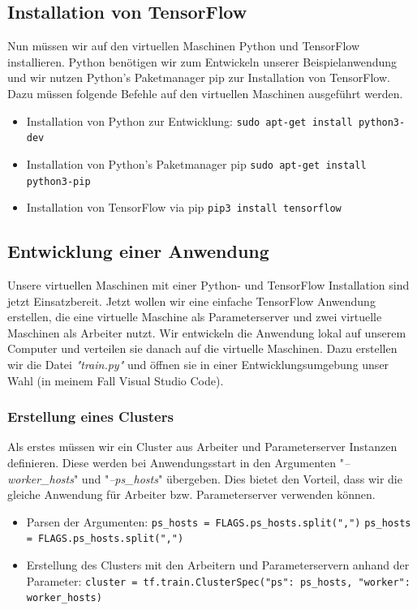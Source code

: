 \subsection{Installation von TensorFlow}
Nun müssen wir auf den virtuellen Maschinen Python und TensorFlow installieren. Python benötigen wir zum Entwickeln unserer Beispielanwendung und wir nutzen Python's Paketmanager pip zur Installation von TensorFlow. Dazu müssen folgende Befehle auf den virtuellen Maschinen ausgeführt werden.
\begin{itemize}
	\item Installation von Python zur Entwicklung:\newline
			\texttt{sudo apt-get install python3-dev}
	\item Installation von Python's Paketmanager pip\newline
			\texttt{sudo apt-get install python3-pip}
	\item Installation von TensorFlow via pip\newline
			\texttt{pip3 install tensorflow}
\end{itemize}

\subsection{Entwicklung einer Anwendung}
Unsere virtuellen Maschinen mit einer Python- und TensorFlow Installation sind jetzt Einsatzbereit. Jetzt wollen wir eine einfache TensorFlow Anwendung erstellen, die eine virtuelle Maschine als Parameterserver und zwei virtuelle Maschinen als Arbeiter nutzt. Wir entwickeln die Anwendung lokal auf unserem Computer und verteilen sie danach auf die virtuelle Maschinen. Dazu erstellen wir die Datei \textit{"train.py"} und öffnen sie in einer Entwicklungsumgebung unser Wahl (in meinem Fall Visual Studio Code). 

\vspace{2mm}
\subsubsection{Erstellung eines Clusters}
Als erstes müssen wir ein Cluster aus Arbeiter und Parameterserver Instanzen definieren. Diese werden bei Anwendungsstart in den Argumenten "\textit{--worker\_hosts}" und "\textit{--ps\_hosts}" übergeben. Dies bietet den Vorteil, dass wir die gleiche Anwendung für Arbeiter bzw. Parameterserver verwenden können.

\begin{itemize}
	\item Parsen der Argumenten: \newline
		\texttt{ps\_hosts = FLAGS.ps\_hosts.split(",")} \newline
		\texttt{ps\_hosts = FLAGS.ps\_hosts.split(",")}
	\item Erstellung des Clusters mit den Arbeitern und Parameterservern anhand der Parameter: \newline
			\texttt{cluster = tf.train.ClusterSpec({"ps": ps\_hosts, "worker": worker\_hosts})}
\end{itemize}

